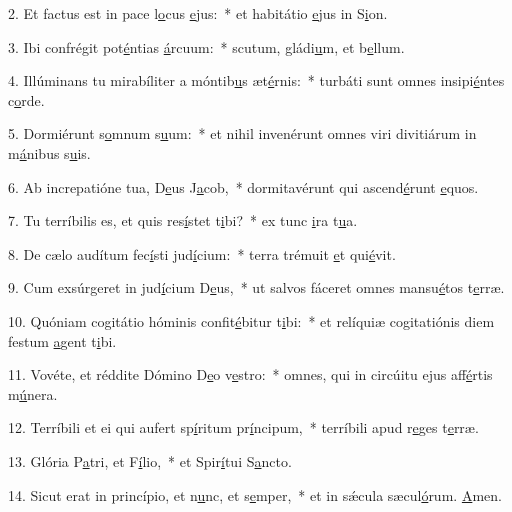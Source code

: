 2. Et factus est in pace l\uline{o}cus \uline{e}jus:~* et habitátio \uline{e}jus in S\uline{i}on.\par 
3. Ibi confrégit pot\uline{é}ntias \uline{á}rcuum:~* scutum, gládi\uline{u}m, et b\uline{e}llum.\par 
4. Illúminans tu mirabíliter a móntib\uline{u}s æt\uline{é}rnis:~* turbáti sunt omnes insipi\uline{é}ntes c\uline{o}rde.\par 
5. Dormiérunt s\uline{o}mnum s\uline{u}um:~* et nihil invenérunt omnes viri divitiárum in m\uline{á}nibus s\uline{u}is.\par 
6. Ab increpatióne tua, D\uline{e}us J\uline{a}cob,~* dormitavérunt qui ascend\uline{é}runt \uline{e}quos.\par 
7. Tu terríbilis es, et quis res\uline{í}stet t\uline{i}bi?~* ex tunc \uline{i}ra t\uline{u}a.\par 
8. De cælo audítum fec\uline{í}sti jud\uline{í}cium:~* terra trémuit \uline{e}t qui\uline{é}vit.\par 
9. Cum exsúrgeret in jud\uline{í}cium D\uline{e}us,~* ut salvos fáceret omnes mansu\uline{é}tos t\uline{e}rræ.\par 
10. Quóniam cogitátio hóminis confit\uline{é}bitur t\uline{i}bi:~* et relíquiæ cogitatiónis diem festum \uline{a}gent t\uline{i}bi.\par 
11. Vovéte, et réddite Dómino D\uline{e}o v\uline{e}stro:~* omnes, qui in circúitu ejus aff\uline{é}rtis m\uline{ú}nera.\par 
12. Terríbili et ei qui aufert sp\uline{í}ritum pr\uline{í}ncipum,~* terríbili apud r\uline{e}ges t\uline{e}rræ.\par 
13. Glória P\uline{a}tri, et F\uline{í}lio,~* et Spir\uline{í}tui S\uline{a}ncto.\par 
14. Sicut erat in princípio, et n\uline{u}nc, et s\uline{e}mper,~* et in sǽcula sæcul\uline{ó}rum. \uline{A}men.\par 
